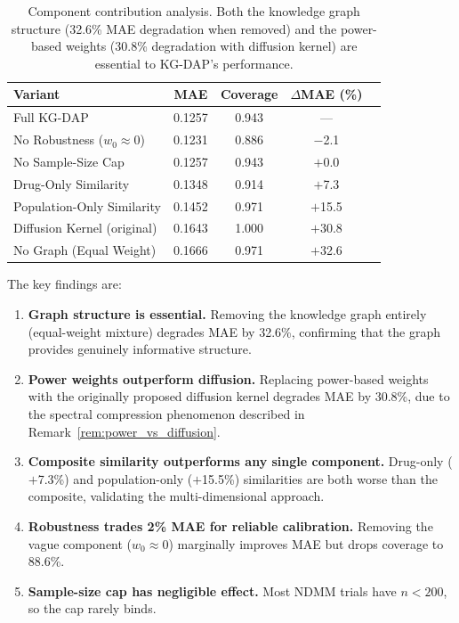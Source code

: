 \documentclass[12pt]{article}
\begin{document}
\begin{table}[t]
\centering
\caption{Component contribution analysis. Both the knowledge graph structure (32.6\% MAE degradation when removed) and the power-based weights (30.8\% degradation with diffusion kernel) are essential to KG-DAP's performance.}
\label{tab:ablation}
\begin{tabular}{lcccc}
\toprule
Variant & MAE & Coverage & $\Delta$MAE (\%) \\
\midrule
Full KG-DAP                   & 0.1257 & 0.943 & ---      \\
No Robustness ($w_0 \approx 0$) & 0.1231 & 0.886 & $-$2.1  \\
No Sample-Size Cap            & 0.1257 & 0.943 & $+$0.0  \\
Drug-Only Similarity          & 0.1348 & 0.914 & $+$7.3  \\
Population-Only Similarity    & 0.1452 & 0.971 & $+$15.5 \\
Diffusion Kernel (original)   & 0.1643 & 1.000 & $+$30.8 \\
No Graph (Equal Weight)       & 0.1666 & 0.971 & $+$32.6 \\
\bottomrule
\end{tabular}
\end{table}

The key findings are:

\begin{enumerate}
\item \textbf{Graph structure is essential.} Removing the knowledge graph entirely (equal-weight mixture) degrades MAE by 32.6\%, confirming that the graph provides genuinely informative structure.

\item \textbf{Power weights outperform diffusion.} Replacing power-based weights with the originally proposed diffusion kernel degrades MAE by 30.8\%, due to the spectral compression phenomenon described in Remark~\ref{rem:power_vs_diffusion}.

\item \textbf{Composite similarity outperforms any single component.} Drug-only ($+$7.3\%) and population-only ($+$15.5\%) similarities are both worse than the composite, validating the multi-dimensional approach.

\item \textbf{Robustness trades 2\% MAE for reliable calibration.} Removing the vague component ($w_0 \approx 0$) marginally improves MAE but drops coverage to 88.6\%.

\item \textbf{Sample-size cap has negligible effect.} Most NDMM trials have $n < 200$, so the cap rarely binds.
\end{enumerate}
\end{document}
